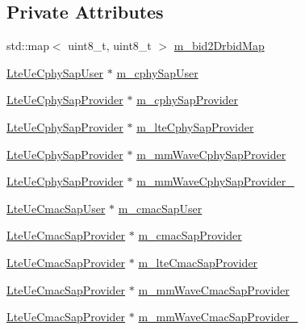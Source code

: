 \subsection*{Private Attributes}
\begin{DoxyCompactItemize}
\item 
std\+::map$<$ uint8\+\_\+t, uint8\+\_\+t $>$ \hyperlink{classns3_1_1LteUeRrc_a4b117cdc930ea78ed844b3fc44872d00}{m\+\_\+bid2\+Drbid\+Map}
\item 
\hyperlink{classns3_1_1LteUeCphySapUser}{Lte\+Ue\+Cphy\+Sap\+User} $\ast$ \hyperlink{classns3_1_1LteUeRrc_a10e8058dbf5f4ebbe3f78c659551dd55}{m\+\_\+cphy\+Sap\+User}
\item 
\hyperlink{classns3_1_1LteUeCphySapProvider}{Lte\+Ue\+Cphy\+Sap\+Provider} $\ast$ \hyperlink{classns3_1_1LteUeRrc_a0441858e31f56c75678afa92b7c7193d}{m\+\_\+cphy\+Sap\+Provider}
\item 
\hyperlink{classns3_1_1LteUeCphySapProvider}{Lte\+Ue\+Cphy\+Sap\+Provider} $\ast$ \hyperlink{classns3_1_1LteUeRrc_a1e077c58f72b6a5c36fe28e4a6b0606b}{m\+\_\+lte\+Cphy\+Sap\+Provider}
\item 
\hyperlink{classns3_1_1LteUeCphySapProvider}{Lte\+Ue\+Cphy\+Sap\+Provider} $\ast$ \hyperlink{classns3_1_1LteUeRrc_a7d0fef159ab96ad88a528d64c01874ee}{m\+\_\+mm\+Wave\+Cphy\+Sap\+Provider}
\item 
\hyperlink{classns3_1_1LteUeCphySapProvider}{Lte\+Ue\+Cphy\+Sap\+Provider} $\ast$ \hyperlink{classns3_1_1LteUeRrc_a663fd643ac4be7abc39b5bdfd85e4e05}{m\+\_\+mm\+Wave\+Cphy\+Sap\+Provider\+\_}
\item 
\hyperlink{classns3_1_1LteUeCmacSapUser}{Lte\+Ue\+Cmac\+Sap\+User} $\ast$ \hyperlink{classns3_1_1LteUeRrc_a4bc512cb0812f661cd5a69b6cfb6866f}{m\+\_\+cmac\+Sap\+User}
\item 
\hyperlink{classns3_1_1LteUeCmacSapProvider}{Lte\+Ue\+Cmac\+Sap\+Provider} $\ast$ \hyperlink{classns3_1_1LteUeRrc_a5a7bffd2040d73eb5db1aaef849d0396}{m\+\_\+cmac\+Sap\+Provider}
\item 
\hyperlink{classns3_1_1LteUeCmacSapProvider}{Lte\+Ue\+Cmac\+Sap\+Provider} $\ast$ \hyperlink{classns3_1_1LteUeRrc_acc0eaf7cf5a1ec8706f57b8164fcad4f}{m\+\_\+lte\+Cmac\+Sap\+Provider}
\item 
\hyperlink{classns3_1_1LteUeCmacSapProvider}{Lte\+Ue\+Cmac\+Sap\+Provider} $\ast$ \hyperlink{classns3_1_1LteUeRrc_ac48418b0f235043204868e73c073ec0b}{m\+\_\+mm\+Wave\+Cmac\+Sap\+Provider}
\item 
\hyperlink{classns3_1_1LteUeCmacSapProvider}{Lte\+Ue\+Cmac\+Sap\+Provider} $\ast$ \hyperlink{classns3_1_1LteUeRrc_ad57849b84ca3da54a2a85ab91c63327b}{m\+\_\+mm\+Wave\+Cmac\+Sap\+Provider\+\_}

\end{DoxyCompactItemize}
